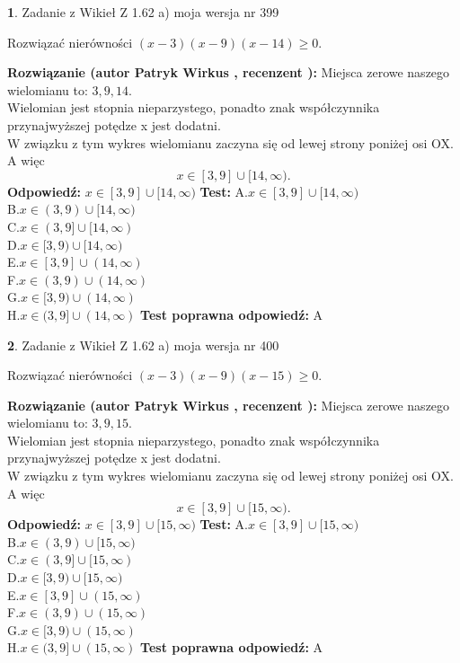 \documentclass[12pt, a4paper]{article}
\theoremstyle{definition} %
\newtheorem{zad}{}
\newcommand{\zadStart}[1]{\begin{zad}#1\newline}
\newcommand{\zadStop}{\end{zad}}
\newcommand{\rozwStart}[2]{\noindent \textbf{Rozwiązanie (autor #1 , recenzent #2): }\newline}
\newcommand{\rozwStop}{\newline}
\newcommand{\odpStart}{\noindent \textbf{Odpowiedź:}\newline}
\newcommand{\odpStop}{\newline}
\newcommand{\testStart}{\noindent \textbf{Test:}\newline}
\newcommand{\testStop}{\newline}
\newcommand{\kluczStart}{\noindent \textbf{Test poprawna odpowiedź:}\newline}
\newcommand{\kluczStop}{\newline}
\begin{document}
\zadStart{Zadanie z Wikieł Z 1.62 a) moja wersja nr 399}

Rozwiązać nierówności $(x-3)(x-9)(x-14)\ge0$.
\zadStop
\rozwStart{Patryk Wirkus}{}
Miejsca zerowe naszego wielomianu to: $3, 9, 14$.\\
Wielomian jest stopnia nieparzystego, ponadto znak współczynnika przy\linebreak najwyższej potędze x jest dodatni.\\ W związku z tym wykres wielomianu zaczyna się od lewej strony poniżej osi OX. A więc $$x \in [3,9] \cup [14,\infty).$$
\rozwStop
\odpStart
$x \in [3,9] \cup [14,\infty)$
\odpStop
\testStart
A.$x \in [3,9] \cup [14,\infty)$\\
B.$x \in (3,9) \cup [14,\infty)$\\
C.$x \in (3,9] \cup [14,\infty)$\\
D.$x \in [3,9) \cup [14,\infty)$\\
E.$x \in [3,9] \cup (14,\infty)$\\
F.$x \in (3,9) \cup (14,\infty)$\\
G.$x \in [3,9) \cup (14,\infty)$\\
H.$x \in (3,9] \cup (14,\infty)$
\testStop
\kluczStart
A
\kluczStop



\zadStart{Zadanie z Wikieł Z 1.62 a) moja wersja nr 400}

Rozwiązać nierówności $(x-3)(x-9)(x-15)\ge0$.
\zadStop
\rozwStart{Patryk Wirkus}{}
Miejsca zerowe naszego wielomianu to: $3, 9, 15$.\\
Wielomian jest stopnia nieparzystego, ponadto znak współczynnika przy\linebreak najwyższej potędze x jest dodatni.\\ W związku z tym wykres wielomianu zaczyna się od lewej strony poniżej osi OX. A więc $$x \in [3,9] \cup [15,\infty).$$
\rozwStop
\odpStart
$x \in [3,9] \cup [15,\infty)$
\odpStop
\testStart
A.$x \in [3,9] \cup [15,\infty)$\\
B.$x \in (3,9) \cup [15,\infty)$\\
C.$x \in (3,9] \cup [15,\infty)$\\
D.$x \in [3,9) \cup [15,\infty)$\\
E.$x \in [3,9] \cup (15,\infty)$\\
F.$x \in (3,9) \cup (15,\infty)$\\
G.$x \in [3,9) \cup (15,\infty)$\\
H.$x \in (3,9] \cup (15,\infty)$
\testStop
\kluczStart
A
\kluczStop
\end{document}
